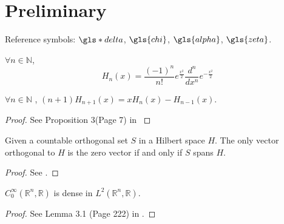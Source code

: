 \chapter{Preliminary}

Reference symbols: $\gls*{delta}$, $\gls{chi}$, $\gls{alpha}$, $\gls{zeta}$.

\begin{definition}
$\forall n \in \mathbb{N}$, 
\[H_{n}(x) = \frac{(-1)^n}{n!}e^{\frac{x^2}{2}}\frac{d^n}{d x^n} e^{-\frac{x^2}{2}}\]
\end{definition}

\begin{property}
$\forall n \in \mathbb{N}$
, $(n + 1)H_{n+1}(x) = x H_{n}(x) - H_{n-1}(x)$. 
\end{property}

\begin{theorem}
\label{theorem:Doob-Dynkin Lemma}
\end{theorem}

\begin{proof}
See Proposition  3(Page 7) in
\parencite{ProbabilityTheorywithApplications}
\end{proof}

\begin{theorem}
\label{theorem:zero is the only vector orthogonal to dense}
Given a countable orthogonal set $S$ in a Hilbert space $H$. The only vector orthogonal to $H$ is the zero vector if and only if $S$ spans $H$.
\end{theorem}

\begin{proof}
See \parencite{AnIntroductiontoHilbertSpace}. 
\end{proof}

\begin{theorem}
\label{theorem:compact support smooth function is dense in L^2}
$C_{0}^{\infty}(\mathbb{R}^n, \mathbb{R})$ is dense in $L^2(\mathbb{R}^n, \mathbb{R})$. 
\end{theorem}

\begin{proof}
See Lemma 3.1 (Page 222) in 
\parencite{RealAnalysisMeasureTheoryIntegrationandHilbertSpaces}. 
\end{proof}


